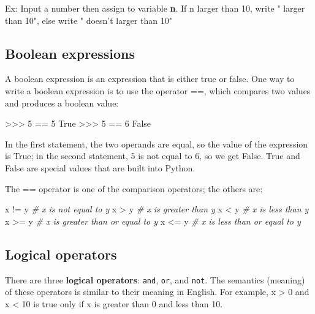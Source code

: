 \documentclass[11pt]{article}
\newenvironment{Shaded}{}{}
\newcommand{\DecValTok}[1]{\textcolor[rgb]{0.25,0.63,0.44}{{#1}}}
\newcommand{\CommentTok}[1]{\textcolor[rgb]{0.38,0.63,0.69}{\textit{{#1}}}}
\newcommand{\NormalTok}[1]{{#1}}
\newcommand{\VariableTok}[1]{\textcolor[rgb]{0.10,0.09,0.49}{{#1}}}
\newcommand{\OperatorTok}[1]{\textcolor[rgb]{0.40,0.40,0.40}{{#1}}}
\begin{document}
Ex: Input a number then assign to variable \textbf{n}. If n larger than
10, write " larger than 10", else write " doesn't larger than 10"

    \subsection{Boolean expressions}\label{boolean-expressions}

A boolean expression is an expression that is either true or false. One
way to write a boolean expression is to use the operator ==, which
compares two values and produces a boolean value:

\begin{Shaded}
\begin{Highlighting}[]
\OperatorTok{>>>} \DecValTok{5} \OperatorTok{==} \DecValTok{5} 
\VariableTok{True} 
\OperatorTok{>>>} \DecValTok{5} \OperatorTok{==} \DecValTok{6} 
\VariableTok{False} 
\end{Highlighting}
\end{Shaded}

In the first statement, the two operands are equal, so the value of the
expression is True; in the second statement, 5 is not equal to 6, so we
get False. True and False are special values that are built into Python.

The == operator is one of the comparison operators; the others are:

\begin{Shaded}
\begin{Highlighting}[]
\NormalTok{x }\OperatorTok{!=}\NormalTok{ y               }\CommentTok{# x is not equal to y }
\NormalTok{x }\OperatorTok{>}\NormalTok{ y                }\CommentTok{# x is greater than y }
\NormalTok{x }\OperatorTok{<}\NormalTok{ y                }\CommentTok{# x is less than y }
\NormalTok{x }\OperatorTok{>=}\NormalTok{ y               }\CommentTok{# x is greater than or equal to y }
\NormalTok{x }\OperatorTok{<=}\NormalTok{ y               }\CommentTok{# x is less than or equal to y }
\end{Highlighting}
\end{Shaded}

    \subsection{Logical operators}\label{logical-operators}

There are three \textbf{logical operators}: \texttt{and}, \texttt{or},
and \texttt{not}. The semantics (meaning) of these operators is similar
to their meaning in English. For example, x \textgreater{} 0 and x
\textless{} 10 is true only if x is greater than 0 and less than 10.
\end{document}
